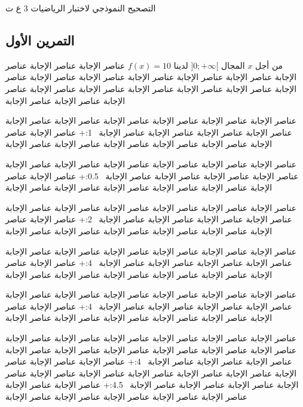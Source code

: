 \documentclass[12pt]{article}
\begin{document}
\sujetset

التصحيح النموذجي لاختبار الرياضيات 3 ع ت 


\begin{correction}

\section{التمرين الأول}


 من أجل $x$ المجال 
 $]0;+\infty[$ 
 لدينا $f(x)=10$ 
\nl
عناصر الإجابة عناصر الإجابة عناصر الإجابة عناصر الإجابة عناصر الإجابة عناصر الإجابة عناصر الإجابة عناصر الإجابة عناصر الإجابة عناصر الإجابة   عناصر الإجابة عناصر الإجابة عناصر الإجابة عناصر الإجابة عناصر الإجابة عناصر الإجابة عناصر الإجابة  

عناصر الإجابة عناصر الإجابة عناصر الإجابة عناصر الإجابة عناصر الإجابة عناصر الإجابة عناصر الإجابة عناصر الإجابة عناصر الإجابة عناصر الإجابة ~1:+ عناصر الإجابة عناصر الإجابة عناصر الإجابة عناصر الإجابة عناصر الإجابة عناصر الإجابة عناصر الإجابة

عناصر الإجابة عناصر الإجابة عناصر الإجابة عناصر الإجابة عناصر الإجابة عناصر الإجابة عناصر الإجابة عناصر الإجابة عناصر الإجابة عناصر الإجابة ~0.5:+ عناصر الإجابة عناصر الإجابة عناصر الإجابة عناصر الإجابة عناصر الإجابة عناصر الإجابة عناصر الإجابة

عناصر الإجابة عناصر الإجابة عناصر الإجابة عناصر الإجابة عناصر الإجابة عناصر الإجابة عناصر الإجابة عناصر الإجابة عناصر الإجابة عناصر الإجابة ~2:+ عناصر الإجابة عناصر الإجابة عناصر الإجابة عناصر الإجابة عناصر الإجابة عناصر الإجابة عناصر الإجابة

عناصر الإجابة عناصر الإجابة عناصر الإجابة عناصر الإجابة عناصر الإجابة عناصر الإجابة عناصر الإجابة عناصر الإجابة عناصر الإجابة عناصر الإجابة ~4:+ عناصر الإجابة عناصر الإجابة عناصر الإجابة عناصر الإجابة عناصر الإجابة عناصر الإجابة عناصر الإجابة

عناصر الإجابة عناصر الإجابة عناصر الإجابة عناصر الإجابة عناصر الإجابة عناصر الإجابة عناصر الإجابة عناصر الإجابة عناصر الإجابة عناصر الإجابة ~4:+ عناصر الإجابة عناصر الإجابة عناصر الإجابة عناصر الإجابة عناصر الإجابة عناصر الإجابة عناصر الإجابة

عناصر الإجابة عناصر الإجابة عناصر الإجابة عناصر الإجابة عناصر الإجابة عناصر الإجابة عناصر الإجابة عناصر الإجابة عناصر الإجابة عناصر الإجابة  عناصر الإجابة عناصر الإجابة عناصر الإجابة عناصر الإجابة عناصر الإجابة ~4:+ عناصر الإجابة عناصر الإجابة
\nl
\hline
عناصر الإجابة عناصر الإجابة عناصر الإجابة عناصر الإجابة عناصر الإجابة عناصر الإجابة عناصر الإجابة عناصر الإجابة عناصر الإجابة عناصر الإجابة ~4.5:+ عناصر الإجابة عناصر الإجابة عناصر الإجابة عناصر الإجابة عناصر الإجابة عناصر الإجابة عناصر الإجابة


\end{correction}
\end{document}
